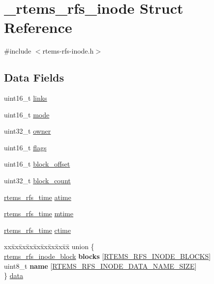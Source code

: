 \hypertarget{struct__rtems__rfs__inode}{}\section{\+\_\+rtems\+\_\+rfs\+\_\+inode Struct Reference}
\label{struct__rtems__rfs__inode}


{\ttfamily \#include $<$rtems-\/rfs-\/inode.\+h$>$}

\subsection*{Data Fields}
\begin{DoxyCompactItemize}
\item 
uint16\+\_\+t \mbox{\hyperlink{struct__rtems__rfs__inode_a878b5263e3f521283af79db51e995b5d}{links}}
\item 
uint16\+\_\+t \mbox{\hyperlink{struct__rtems__rfs__inode_a3fa86fbf98f359014ff1c6a1bfa21fb8}{mode}}
\item 
uint32\+\_\+t \mbox{\hyperlink{struct__rtems__rfs__inode_aa782e1cd255be914e47ba16e018a7f4d}{owner}}
\item 
uint16\+\_\+t \mbox{\hyperlink{struct__rtems__rfs__inode_a89cb2af02b004971b6ae2fed03c32a33}{flags}}
\item 
uint16\+\_\+t \mbox{\hyperlink{struct__rtems__rfs__inode_a5bb045a3c36ef0babebbbeebc8a52340}{block\+\_\+offset}}
\item 
uint32\+\_\+t \mbox{\hyperlink{struct__rtems__rfs__inode_a4dd1d6c2203dce216162de495fc352f1}{block\+\_\+count}}
\item 
\mbox{\hyperlink{rtems-rfs-inode_8h_a7877cc60240d76cccb89acaffdd20aa6}{rtems\+\_\+rfs\+\_\+time}} \mbox{\hyperlink{struct__rtems__rfs__inode_ae28356c51f71254e11b3578a9c36df81}{atime}}
\item 
\mbox{\hyperlink{rtems-rfs-inode_8h_a7877cc60240d76cccb89acaffdd20aa6}{rtems\+\_\+rfs\+\_\+time}} \mbox{\hyperlink{struct__rtems__rfs__inode_aac67d1c3cf26098e0b62aac5bc906507}{mtime}}
\item 
\mbox{\hyperlink{rtems-rfs-inode_8h_a7877cc60240d76cccb89acaffdd20aa6}{rtems\+\_\+rfs\+\_\+time}} \mbox{\hyperlink{struct__rtems__rfs__inode_ab9d5b56f4b8db425fb20d31815c12008}{ctime}}
\item 
\begin{tabbing}
xx\=xx\=xx\=xx\=xx\=xx\=xx\=xx\=xx\=\kill
union \{\\
\>\mbox{\hyperlink{rtems-rfs-inode_8h_aa30717f37e5238a8f6387b4d0dbb2ae3}{rtems\_rfs\_inode\_block}} {\bfseries blocks} \mbox{[}\mbox{\hyperlink{rtems-rfs-file-system_8h_a89ff31e716c58b51c65d688662acb012}{RTEMS\_RFS\_INODE\_BLOCKS}}\mbox{]}\\
\>uint8\_t {\bfseries name} \mbox{[}\mbox{\hyperlink{rtems-rfs-inode_8h_aa50fd5fe0992936ddfae7aec4e2506f3}{RTEMS\_RFS\_INODE\_DATA\_NAME\_SIZE}}\mbox{]}\\
\} \mbox{\hyperlink{struct__rtems__rfs__inode_ac15acee2452f036f667e6e21dff97a99}{data}}\\


\end{tabbing}
\end{DoxyCompactItemize}

